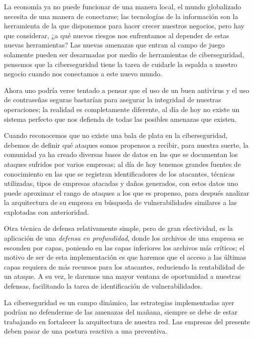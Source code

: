\documentclass[12pt]{article}
\begin{document}
    La economía ya no puede funcionar de una manera local, el mundo globalizado necesita de una manera de conectarse; las tecnologías de la información son la herramienta de la que disponemos para hacer crecer nuestros negocios, pero hay que considerar, ¿a qué nuevos riesgos nos enfrentamos al depender de estas nuevas herramientas? Las nuevas amenazas que entran al campo de juego solamente pueden ser desarmadas por medio de herramientas de ciberseguridad, pensemos que la ciberseguridad tiene la tarea de cuidarle la espalda a nuestro negocio cuando nos conectamos a este nuevo mundo.

    Ahora uno podría verse tentado a pensar que el uso de un buen antivirus y el uso de contraseñas seguras bastarían para asegurar la integridad de nuestras operaciones; la realidad es completamente diferente, al día de hoy no existe un sistema perfecto que nos defienda de todas las posibles amenazas que existen.

    Cuando reconocemos que no existe una bala de plata en la ciberseguridad, debemos de definir qué ataques somos propensos a recibir, para nuestra suerte, la comunidad ya ha creado diversas bases de datos en las que se documentan los ataques sufridos por varios empresas; al día de hoy tenemos grandes fuentes de conocimiento en las que se registran identificadores de los atacantes, técnicas utilizadas, tipos de empresas atacadas y daños generados, con estos datos uno puede aproximar el rango de ataques a los que es propenso, para después analizar la arquitectura de su empresa en búsqueda de vulnerabilidades similares a las explotadas con anterioridad.

    Otra técnica de defensa relativamente simple, pero de gran efectividad, es la aplicación de una \emph{defensa en profundidad}, donde los archivos de una empresa se esconden por capas, poniendo en las capas inferiores los archivos más críticos; el motivo de ser de esta implementación es que haremos que el acceso a las últimas capas requiera de más recursos para los atacantes, reduciendo la rentabilidad de un ataque. A su vez, le daremos una mayor ventana de oportunidad a nuestras defensas, facilitando la tarea de identificación de vulnerabilidades.

    La ciberseguridad es un campo dinámico, las estrategias implementadas ayer podrían no defenderme de las amenazas del mañana, siempre se debe de estar trabajando en fortalecer la arquitectura de nuestra red. Las empresas del presente deben pasar de una postura reactiva a una preventiva.
\end{document}
